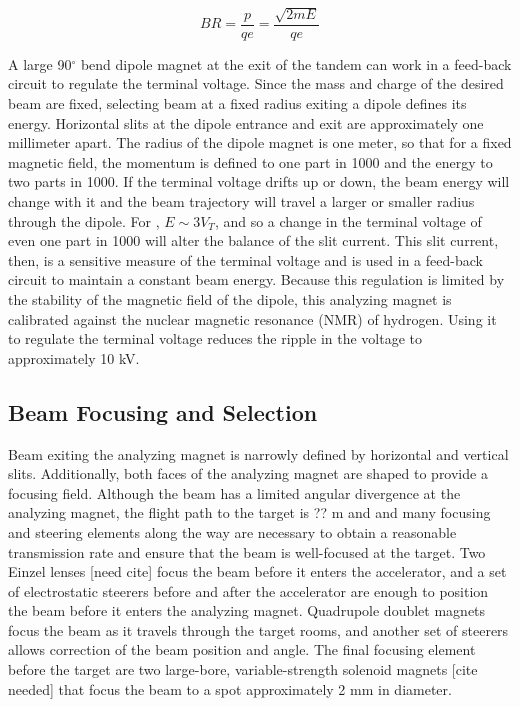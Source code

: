 \begin{equation}
BR = \frac{p}{qe} = \frac{\sqrt{2mE}}{qe}
\label{eqn:rigidity}
\end{equation}

A large 90$^{\circ}$ bend dipole magnet at the exit of the tandem can work in a feed-back circuit to regulate the terminal voltage.  Since the mass and charge of the desired beam are fixed, selecting beam at a fixed radius exiting a dipole defines its energy.  Horizontal slits at the dipole entrance and exit are approximately one millimeter apart.  The radius of the dipole magnet is one meter, so that for a fixed magnetic field, the momentum is defined to one part in 1000 and the energy to two parts in 1000.  If the terminal voltage drifts up or down, the beam energy will change with it and the beam trajectory will travel a larger or smaller radius through the dipole.  For , $E\sim3V_T$, and so a change in the terminal voltage of even one part in 1000 will alter the balance of the slit current.  This slit current, then, is a sensitive measure of the terminal voltage and is used in a feed-back circuit to maintain a constant beam energy.  Because this regulation is limited by the stability of the magnetic field of the dipole, this analyzing magnet is calibrated against the nuclear magnetic resonance (NMR) of hydrogen.  Using it to regulate the terminal voltage reduces the ripple in the voltage to approximately 10 kV.


\subsection{Beam Focusing and Selection}

Beam exiting the analyzing magnet is narrowly defined by horizontal and vertical slits.  Additionally, both faces of the analyzing magnet are shaped to provide a focusing field.  Although the beam has a limited angular divergence at the analyzing magnet, the flight path to the target is ?? m and and many focusing and steering elements along the way are necessary to obtain a reasonable transmission rate and ensure that the beam is well-focused at the target.  Two Einzel lenses [need cite] focus the beam before it enters the accelerator, and a set of electrostatic steerers before and after the accelerator are enough to position the beam before it enters the analyzing magnet.  Quadrupole doublet magnets focus the beam as it travels through the target rooms, and another set of steerers allows correction of the beam position and angle.  The final focusing element before the target are two large-bore, variable-strength solenoid magnets [cite needed] that focus the beam to a spot approximately 2 mm in diameter.

